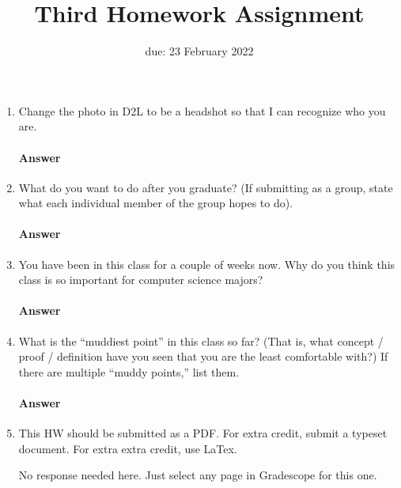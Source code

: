 \renewcommand{\hwnum}{3}

\title{Third Homework Assignment}
\date{due: 23 February 2022}
\maketitle




\begin{enumerate}

    \item Change the photo in D2L to be a headshot so that I can recognize who you are.
        \paragraph{Answer}

    \item What do you want to do after you graduate? (If submitting as a group,
        state what each individual member of the group hopes to do).
        \paragraph{Answer}
        \todo{}

    \item You have been in this class for a couple of weeks now.  Why do you
        think this class is so important for computer science majors?
        \paragraph{Answer}
        \todo{}

    \item What is the ``muddiest point'' in this class so far?  (That is, what
        concept / proof / definition have you seen that you are the least
        comfortable with?)  If there are multiple ``muddy points,'' list them.
        \paragraph{Answer}
        \todo{}

    \item This HW should be submitted as a PDF.
        For extra credit, submit a typeset document. For extra extra credit,
        use LaTex.

        No response needed here. Just select any page in Gradescope
        for this one.

\end{enumerate}

